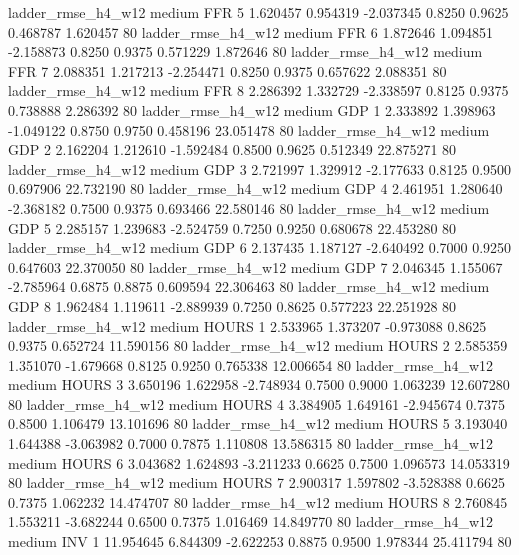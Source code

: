     ladder_rmse_h4_w12     medium      FFR                 5  1.620457 0.954319 -2.037345 0.8250 0.9625  0.468787    1.620457 80
    ladder_rmse_h4_w12     medium      FFR                 6  1.872646 1.094851 -2.158873 0.8250 0.9375  0.571229    1.872646 80
    ladder_rmse_h4_w12     medium      FFR                 7  2.088351 1.217213 -2.254471 0.8250 0.9375  0.657622    2.088351 80
    ladder_rmse_h4_w12     medium      FFR                 8  2.286392 1.332729 -2.338597 0.8125 0.9375  0.738888    2.286392 80
    ladder_rmse_h4_w12     medium      GDP                 1  2.333892 1.398963 -1.049122 0.8750 0.9750  0.458196   23.051478 80
    ladder_rmse_h4_w12     medium      GDP                 2  2.162204 1.212610 -1.592484 0.8500 0.9625  0.512349   22.875271 80
    ladder_rmse_h4_w12     medium      GDP                 3  2.721997 1.329912 -2.177633 0.8125 0.9500  0.697906   22.732190 80
    ladder_rmse_h4_w12     medium      GDP                 4  2.461951 1.280640 -2.368182 0.7500 0.9375  0.693466   22.580146 80
    ladder_rmse_h4_w12     medium      GDP                 5  2.285157 1.239683 -2.524759 0.7250 0.9250  0.680678   22.453280 80
    ladder_rmse_h4_w12     medium      GDP                 6  2.137435 1.187127 -2.640492 0.7000 0.9250  0.647603   22.370050 80
    ladder_rmse_h4_w12     medium      GDP                 7  2.046345 1.155067 -2.785964 0.6875 0.8875  0.609594   22.306463 80
    ladder_rmse_h4_w12     medium      GDP                 8  1.962484 1.119611 -2.889939 0.7250 0.8625  0.577223   22.251928 80
    ladder_rmse_h4_w12     medium    HOURS                 1  2.533965 1.373207 -0.973088 0.8625 0.9375  0.652724   11.590156 80
    ladder_rmse_h4_w12     medium    HOURS                 2  2.585359 1.351070 -1.679668 0.8125 0.9250  0.765338   12.006654 80
    ladder_rmse_h4_w12     medium    HOURS                 3  3.650196 1.622958 -2.748934 0.7500 0.9000  1.063239   12.607280 80
    ladder_rmse_h4_w12     medium    HOURS                 4  3.384905 1.649161 -2.945674 0.7375 0.8500  1.106479   13.101696 80
    ladder_rmse_h4_w12     medium    HOURS                 5  3.193040 1.644388 -3.063982 0.7000 0.7875  1.110808   13.586315 80
    ladder_rmse_h4_w12     medium    HOURS                 6  3.043682 1.624893 -3.211233 0.6625 0.7500  1.096573   14.053319 80
    ladder_rmse_h4_w12     medium    HOURS                 7  2.900317 1.597802 -3.528388 0.6625 0.7375  1.062232   14.474707 80
    ladder_rmse_h4_w12     medium    HOURS                 8  2.760845 1.553211 -3.682244 0.6500 0.7375  1.016469   14.849770 80
    ladder_rmse_h4_w12     medium      INV                 1 11.954645 6.844309 -2.622253 0.8875 0.9500  1.978344   25.411794 80
